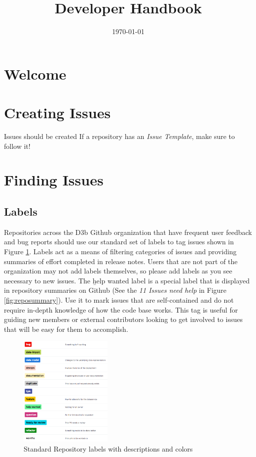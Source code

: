 \documentclass[a4paper,12pt,titlepage]{scrartcl}
\title{Developer Handbook}
\date{\today}
\begin{document}
	\maketitle
	
	\tableofcontents
	\newpage
   
	\section{Welcome}
   
	\section{Creating Issues}
	
	Issues should be created 
	If a repository has an {\em Issue Template}, make sure to follow it!
      
	\section{Finding Issues}
	
	\subsection{Labels}\label{labels}
	
	Repositories across the D3b Github organization that have frequent user feedback and bug reports should use our standard set of labels to tag issues shown in Figure \ref{fig:labels}.
	Labels act as a means of filtering categories of issues and providing summaries of effort completed in release notes.
	Users that are not part of the organization may not add labels themselves, so please add labels as you see necessary to new issues.
	The {\b help wanted} label is a special label that is displayed in repository summaries on Github (See the {\em 11 Issues need help} in Figure \ref{fig:reposummary}).
	Use it to mark issues that are self-contained and do not require in-depth knowledge of how the code base works.
	This tag is useful for guiding new members or external contributors looking to get involved to issues that will be easy for them to accomplish.
   
  	\begin{figure}[h]
  			\centering
    			\includegraphics[width=0.4\textwidth]{images/labels.png}
    			\caption{Standard Repository labels with descriptions and colors}
    			\label{fig:labels}
   	\end{figure}
   
\end{document}

